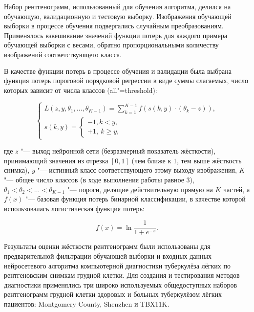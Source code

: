 Набор рентгенограмм, использованный для обучения алгоритма, делился на обучающую, валидационную и тестовую выборку. Изображения обучающей выборки в процессе обучения подвергались случайным преобразованиям. Применялось взвешивание значений функции потерь для каждого примера обучающей выборки с весами, обратно пропорциональными количеству изображений соответствующего класса.

В качестве функции потерь в процессе обучения и валидации была выбрана функция потерь пороговой порядковой регрессии в виде суммы слагаемых, число которых зависит от числа классов (all"=threshold):

\begin{equation}
	\begin{cases}
		L \left( z, y, \theta_1, \ldots, \theta_{K-1} \right) = \sum_{k=1}^{K-1} f \left( s \left( k, y \right) \cdot \left( \theta_k-z \right) \right), \\
		s \left( k, y \right) =
		\begin{cases}
			-1, k < y, \\
			+1, \ k \geq y,
		\end{cases}
	\end{cases} \nonumber
\end{equation}

\noindent где $z$ "--- выход нейронной сети (безразмерный показатель жёсткости), принимающий значения из отрезка $\left[ 0, 1 \right]$ (чем ближе к $1$, тем выше жёсткость снимка), $y$ "--- истинный класс соответствующего этому выходу изображения, $K$ "--- общее число классов (в ходе выполнения работы равное 3), $\theta_1 < \theta_2 < \ldots < \theta_{K-1}$ "--- пороги, делящие действительную прямую на $K$ частей, а $f(x)$ "--- базовая функция потерь бинарной классификации, в качестве которой использовалась логистическая функция потерь:

\begin{equation}
	f \left( x \right) = \ln{\frac{1}{1+e^{-x}}}. \nonumber
\end{equation}

Результаты оценки жёсткости рентгенограмм были использованы для предварительной фильтрации обучающей выборки и входных данных нейросетевого алгоритма компьютерной диагностики туберкулёза лёгких по рентгеновским снимкам грудной клетки. Для создания и тестирования методов диагностики применялись три широко используемых общедоступных наборов рентгенограмм грудной клетки здоровых и больных туберкулёзом лёгких пациентов: Montgomery County, 
Shenzhen 
и TBX11K.


